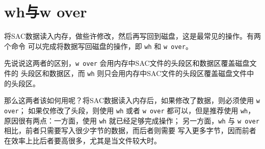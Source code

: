\section{wh与w over}
\label{sec:wh-and-wover}
将SAC数据读入内存，做些许修改，然后再写回到磁盘，这是最常见的操作。有两个命令
可以完成将数据写回磁盘的操作，即 \texttt{wh} 和 \texttt{w over}。

先说说这两者的区别，\texttt{w over} 会用内存中SAC文件的头段区和数据区覆盖磁盘文件的
头段区和数据区，而 \texttt{wh} 则只会用内存中SAC文件的头段区覆盖磁盘文件中的头段区。

那么这两者该如何用呢？将SAC数据读入内存后，如果修改了数据，则必须使用 \texttt{w over}；
如果仅修改了头段，则使用 \texttt{wh} 或者 \texttt{w over} 都可以，但是推荐使用 \texttt{wh}，
原因很有两点：一方面，使用 \texttt{wh} 就已经足够完成操作；
另一方面，\texttt{wh} 与 \texttt{w over} 相比，前者只需要写入很少字节的数据，而后者则需要
写入更多字节，因而前者在效率上比后者要高很多，尤其是当文件较大时。
